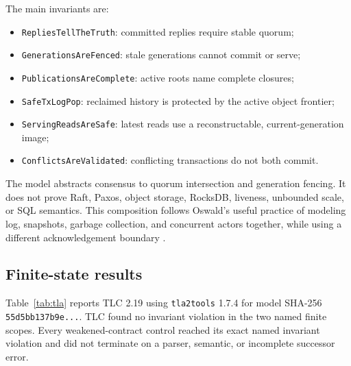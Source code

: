\documentclass[sigconf,nonacm]{acmart}
\begin{document}
The main invariants are:

\begin{itemize}
  \item \texttt{RepliesTellTheTruth}: committed replies require stable quorum;
  \item \texttt{GenerationsAreFenced}: stale generations cannot commit or serve;
  \item \texttt{PublicationsAreComplete}: active roots name complete closures;
  \item \texttt{SafeTxLogPop}: reclaimed history is protected by the active
  object frontier;
  \item \texttt{ServingReadsAreSafe}: latest reads use a reconstructable,
  current-generation image;
  \item \texttt{ConflictsAreValidated}: conflicting transactions do not both
  commit.
\end{itemize}

The model abstracts consensus to quorum intersection and generation fencing. It
does not prove Raft, Paxos, object storage, RocksDB, liveness, unbounded scale,
or SQL semantics. This composition follows Oswald's useful practice of modeling
log, snapshots, garbage collection, and concurrent actors together, while using
a different acknowledgement boundary \cite{oswald2026}.

\subsection{Finite-state results}

Table~\ref{tab:tla} reports TLC 2.19 using \texttt{tla2tools} 1.7.4 for model
SHA-256 \texttt{55d5bb137b9e...}. TLC found no invariant violation in the two
named finite scopes. Every weakened-contract control reached its exact named
invariant violation and did not terminate on a parser, semantic, or incomplete
successor error.
\end{document}
